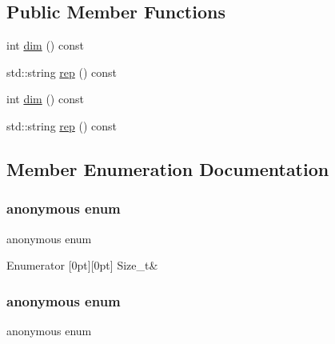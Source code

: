 \subsection*{Public Member Functions}
\begin{DoxyCompactItemize}
\item 
int \mbox{\hyperlink{structHadron_1_1J5Rep_a3ae25f39e16107e667d4a57293cea52b}{dim}} () const
\item 
std\+::string \mbox{\hyperlink{structHadron_1_1J5Rep_a21db8a3fe2ed5b61d05e4e9b0082fc37}{rep}} () const
\item 
int \mbox{\hyperlink{structHadron_1_1J5Rep_a3ae25f39e16107e667d4a57293cea52b}{dim}} () const
\item 
std\+::string \mbox{\hyperlink{structHadron_1_1J5Rep_a21db8a3fe2ed5b61d05e4e9b0082fc37}{rep}} () const
\end{DoxyCompactItemize}


\subsection{Member Enumeration Documentation}
\mbox{\label{structHadron_1_1J5Rep_ab667e3d060e162a2ce0e7f51139ea13b}} 
\subsubsection{\texorpdfstring{anonymous enum}{anonymous enum}}
{\footnotesize\ttfamily anonymous enum}

\begin{DoxyEnumFields}{Enumerator}
[0pt][0pt]{}\mbox{\label{structHadron_1_1J5Rep_a0f98a17d4fdd9263395f110f308934c5a114ac1ed2dab800e721cda73a81aba18}} 
Size\+\_\+t&\\
\hline

\end{DoxyEnumFields}
\mbox{\label{structHadron_1_1J5Rep_a0f98a17d4fdd9263395f110f308934c5}} 
\subsubsection{\texorpdfstring{anonymous enum}{anonymous enum}}
{\footnotesize\ttfamily anonymous enum}

